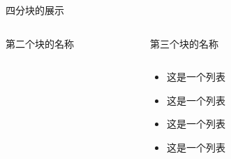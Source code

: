 \documentclass[aspectratio=169]{beamer}
\begin{document}
\begin{frame}{四分块的展示}
\begin{columns}[t]
\begin{column}{0.5\textwidth}
\begin{block}{\scriptsize 第二个块的名称}
\begin{center}
                \end{center}
            \end{block}
        \end{column}
        \begin{column}{0.5\textwidth}
            \begin{block}{\scriptsize 第三个块的名称}
                \begin{columns}[t]  %
                    \begin{column}{0.5\textwidth}
                        \begin{itemize}
                            \item 这是一个列表
                            \item 这是一个列表
                            \item 这是一个列表
                            \item 这是一个列表
                        \end{itemize}
                    \end{column}
                    \hspace{-3em}
                    \begin{column}{0.5\textwidth}
                        \vspace{-2em}
                        \begin{column}{0.5\textwidth}
                            \begin{figure}
                                \centering

\end{figure}
\end{column}
\end{column}
\end{columns}
\end{block}
\end{column}
\end{columns}
\end{frame}
\end{document}
